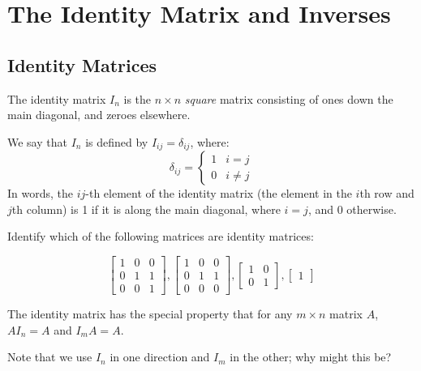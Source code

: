 \documentclass[11pt]{exam}
\begin{document}
\pagebreak
\section{The Identity Matrix and Inverses}
    
    \vspace{20px}
    \subsection{Identity Matrices}

    The identity matrix $I_n$ is the $n \times n$ \textit{square} matrix consisting of ones down the main diagonal, and zeroes elsewhere.

    We say that $I_n$ is defined by $I_{ij} = \delta_{ij}$, where:
    $$\delta_{ij} = \begin{cases} 1 & i = j \\ 
                                  0 & i \neq j \end{cases}$$
    In words, the $ij$-th element of the identity matrix (the element in the $i$th row and $j$th column) is 1 if it is along the main diagonal,
    where $i = j$, and 0 otherwise.

    \begin{questions}
        \item Identify which of the following matrices are identity matrices:
        
        $$\begin{bmatrix} 1 & 0 & 0 \\ 0 & 1 & 1 \\ 0 & 0 & 1 \end{bmatrix},
        \begin{bmatrix} 1 & 0 & 0 \\ 0 & 1 & 1 \\ 0 & 0 & 0 \end{bmatrix},
        \begin{bmatrix} 1 & 0 \\ 0 & 1 \end{bmatrix},
        \begin{bmatrix} 1 \end{bmatrix}$$
    \end{questions}

    The identity matrix has the special property that for any $m \times n$ matrix $A$, $AI_n = A$ and $I_mA = A$.

    Note that we use $I_n$ in one direction and $I_m$ in the other; why might this be?
\end{document}

